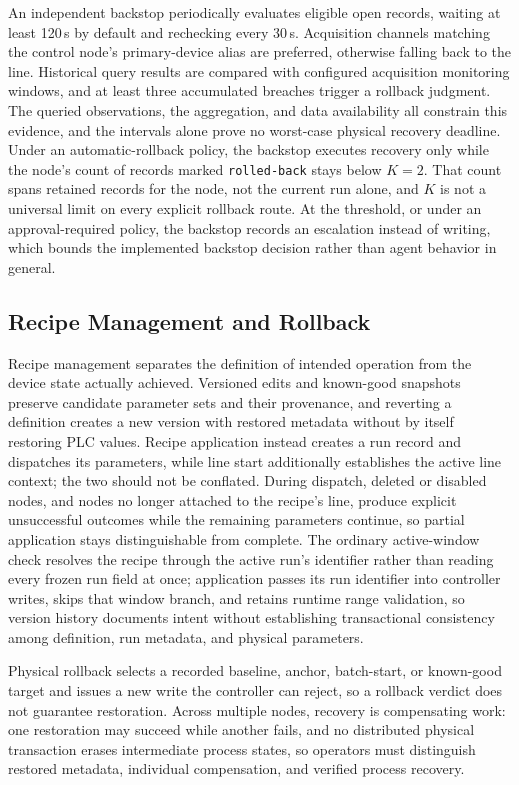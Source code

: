 An independent backstop periodically evaluates eligible open records, waiting at
least 120\,s by default and rechecking every 30\,s. Acquisition channels matching
the control node's primary-device alias are preferred, otherwise falling back to
the line. Historical query results are compared with configured acquisition
monitoring windows, and at least three accumulated breaches trigger a rollback
judgment. The queried observations, the aggregation, and data availability all
constrain this evidence, and the intervals alone prove no worst-case physical
recovery deadline. Under an automatic-rollback policy, the backstop executes
recovery only while the node's count of records marked \texttt{rolled-back} stays
below $K=2$. That count spans retained records for the node, not the current run
alone, and $K$ is not a universal limit on every explicit rollback route. At the
threshold, or under an approval-required policy, the backstop records an escalation
instead of writing, which bounds the implemented backstop decision rather than
agent behavior in general.

\subsection{Recipe Management and Rollback}
\label{sec:recipe}
Recipe management separates the definition of intended operation from the device
state actually achieved. Versioned edits and known-good snapshots preserve
candidate parameter sets and their provenance, and reverting a definition creates a
new version with restored metadata without by itself restoring PLC values. Recipe
application instead creates a run record and dispatches its parameters, while line
start additionally establishes the active line context; the two should not be
conflated. During dispatch, deleted or disabled nodes, and nodes no longer attached
to the recipe's line, produce explicit unsuccessful outcomes while the remaining
parameters continue, so partial application stays distinguishable from complete.
The ordinary active-window check resolves the recipe through the active run's
identifier rather than reading every frozen run field at once; application passes
its run identifier into controller writes, skips that window branch, and retains
runtime range validation, so version history documents intent without establishing
transactional consistency among definition, run metadata, and physical parameters.

Physical rollback selects a recorded baseline, anchor, batch-start, or known-good
target and issues a new write the controller can reject, so a rollback verdict does
not guarantee restoration. Across multiple nodes, recovery is compensating work:
one restoration may succeed while another fails, and no distributed physical
transaction erases intermediate process states, so operators must distinguish
restored metadata, individual compensation, and verified process recovery.

